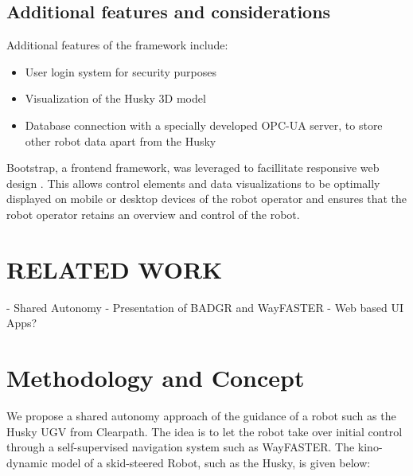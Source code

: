\documentclass[letterpaper, 10 pt, conference]{ieeeconf}  %
\begin{document}
\subsection{Additional features and considerations}
Additional features of the framework include: 
\begin{itemize}
\item User login system for security purposes
\item Visualization of the Husky 3D model 
\item Database connection with a specially developed OPC-UA server, to store other robot data apart from the Husky
\end{itemize}
Bootstrap, a frontend framework, was leveraged to facillitate responsive web design \cite{bootstrap}. 
This allows control elements and data visualizations to be optimally displayed on mobile or desktop devices of the robot operator and ensures that the robot operator retains an overview and control of the robot.








\section{RELATED WORK}
- Shared Autonomy
- Presentation of BADGR and WayFASTER
- Web based UI Apps?



\section{Methodology and Concept}
We propose a shared autonomy approach of the guidance of a robot such as the Husky UGV from Clearpath. 
The idea is to let the robot take over initial control through a self-supervised navigation system such as WayFASTER.
The kino-dynamic model of a skid-steered Robot, such as the Husky, is given below: \cite{wayfaster}
\end{document}
